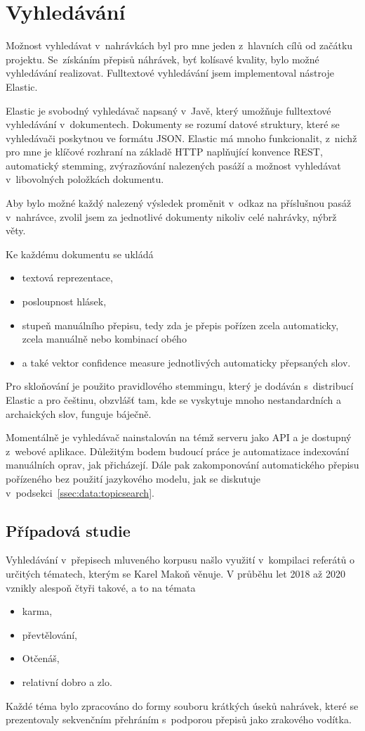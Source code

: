 \chapter{Vyhledávání}
\label{kap:vyhledavani}

Možnost vyhledávat v~nahrávkách byl pro mne jeden z~hlavních cílů od začátku
projektu. Se~získáním přepisů náhrávek, byť kolísavé kvality, bylo možné
vyhledávání realizovat.
Fulltextové vyhledávání jsem implementoval nástroje Elastic.

Elastic je svobodný vyhledávač napsaný v~Javě, který umožňuje fulltextové
vyhledávání v~dokumentech. Dokumenty se rozumí datové struktury, které se
vyhledávači poskytnou ve formátu JSON. Elastic má mnoho funkcionalit,
z~nichž pro mne je klíčové rozhraní na základě HTTP naplňující konvence REST,
automatický stemming, zvýrazňování nalezených pasáží a možnost vyhledávat
v~libovolných položkách dokumentu.

Aby bylo možné každý nalezený výsledek proměnit v~odkaz na příslušnou pasáž
v~nahrávce, zvolil jsem za jednotlivé dokumenty nikoliv celé nahrávky, nýbrž
věty.

Ke každému dokumentu se ukládá
\begin{itemize}
\item{textová reprezentace,}
\item{posloupnost hlásek,}
\item{stupeň
manuálního přepisu, tedy zda je přepis pořízen zcela automaticky, zcela manuálně
nebo kombinací obého}
\item{a také vektor confidence measure jednotlivých automaticky přepsaných slov.}
\end{itemize}

Pro skloňování je použito pravidlového stemmingu, který je dodáván s~distribucí
Elastic a pro češtinu, obzvlášť tam, kde se vyskytuje mnoho
nestandardních a archaických slov, funguje báječně.

Momentálně je vyhledávač nainstalován na témž serveru jako API a je dostupný
z~webové aplikace. Důležitým bodem budoucí práce je automatizace indexování
manuálních oprav, jak přicházejí. Dále pak zakomponování automatického přepisu
pořízeného bez použití jazykového modelu, jak se diskutuje
v~podsekci~\ref{ssec:data:topicsearch}.

\section{Případová studie}

Vyhledávání v~přepisech mluveného korpusu našlo využití v~kompilaci referátů o
určitých tématech, kterým se Karel Makoň věnuje. V průběhu let 2018 až 2020
vznikly alespoň čtyři takové, a to na témata
\begin{itemize}
\item{karma,}
\item{převtělování,}
\item{Otčenáš,}
\item{relativní dobro a zlo.}
\end{itemize}
Každé téma bylo zpracováno do formy souboru krátkých úseků nahrávek, které se
prezentovaly sekvenčním přehráním s~podporou přepisů jako zrakového vodítka.

